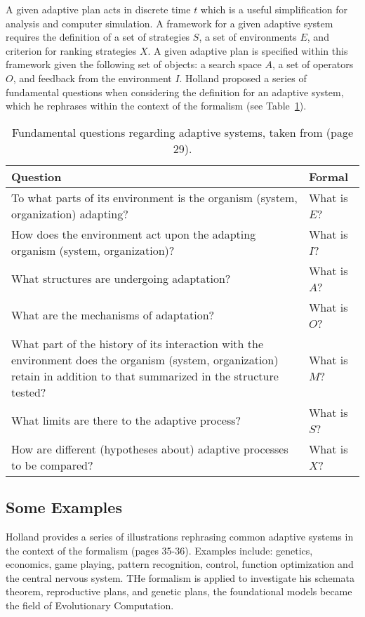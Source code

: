 \documentclass[a4paper, 11pt]{article}
\begin{document}
A given adaptive plan acts in discrete time $t$ which is a useful simplification for analysis and computer simulation. A framework for a given adaptive system requires the definition of a set of strategies $S$, a set of environments $E$, and criterion for ranking strategies $X$. A given adaptive plan is specified within this framework given the following set of objects: a search space $A$, a set of operators $O$, and feedback from the environment $I$. Holland proposed a series of fundamental questions when considering the definition for an adaptive system, which he rephrases within the context of the formalism (see Table~\ref{tab:adaptsys:questions}).

\begin{table}[ht]
	\centering\small
		\begin{tabularx}{\textwidth}{Xl}
		\toprule
		\textbf{Question} & \textbf{Formal} \\ 
		\toprule
		To what parts of its environment is the organism (system, organization) adapting? & What is $E$? \\ 
		\midrule
		How does the environment act upon the adapting organism (system, organization)? & What is $I$? \\ 
		\midrule
		What structures are undergoing adaptation? & What is $A$? \\ 
		\midrule
		What are the mechanisms of adaptation? & What is $O$? \\ 
		\midrule
		What part of the history of its interaction with the environment does the organism (system, organization) retain in addition to that summarized in the structure tested? & What is $M$? \\ 
		\midrule
		What limits are there to the adaptive process? & What is $S$? \\ 
		\midrule
		How are different (hypotheses about) adaptive processes to be compared? & What is $X$? \\ 
		\bottomrule
		\end{tabularx}	
	\caption{Fundamental questions regarding adaptive systems, taken from \cite{Holland1975} (page 29).}
	\label{tab:adaptsys:questions}
\end{table}


\subsection{Some Examples}
Holland provides a series of illustrations rephrasing common adaptive systems in the context of the formalism \cite{Holland1975} (pages 35-36). Examples include: genetics, economics, game playing, pattern recognition, control, function optimization and the central nervous system. THe formalism is applied to investigate his schemata theorem, reproductive plans, and genetic plans, the foundational models became the field of Evolutionary Computation. 
\end{document}
